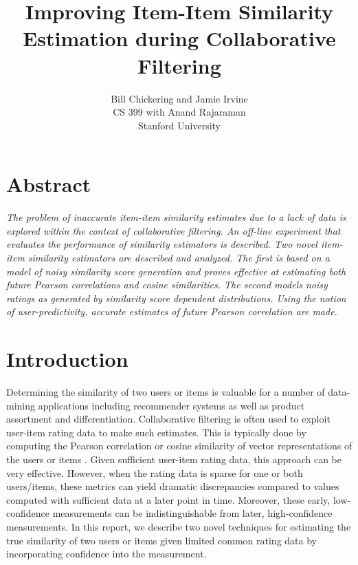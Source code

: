 \documentclass[11pt]{article}
\begin{document}

\title{Improving Item-Item Similarity Estimation during Collaborative Filtering}
\author{Bill Chickering and Jamie Irvine\\
CS 399 with Anand Rajaraman\\
Stanford University}
\renewcommand{\today}{March 25, 2014}
\maketitle

\section*{Abstract}
\emph{The problem of inaccurate item-item similarity estimates due to a lack of
data is explored within the context of collaborative filtering. An off-line
experiment that evaluates the performance of similarity estimators is described.
Two novel item-item similarity estimators are described and analyzed. The first
is based on a model of noisy similarity score generation and proves effective at
estimating both future Pearson correlations and cosine similarities. The second
models noisy ratings as generated by similarity score dependent distributions.
Using the notion of user-predictivity, accurate estimates of future Pearson
correlation are made.}

\section*{Introduction}
Determining the similarity of two users or items is valuable for a number of
data-mining applications including recommender systems as well as product
assortment and differentiation. Collaborative filtering is often used to exploit
user-item rating data to make such estimates. This is typically done by
computing the Pearson correlation or cosine similarity of vector representations
of the users or items \cite{Su2009}. Given sufficient user-item rating data,
this approach can be very effective. However, when the rating data is sparse for
one or both users/items, these metrics can yield dramatic discrepancies compared
to values computed with sufficient data at a later point in time. Moreover,
these early, low-confidence measurements can be indistinguishable from later,
high-confidence measurements.  In this report, we describe two novel techniques
for estimating the true similarity of two users or items given limited common
rating data by incorporating confidence into the measurement.
\end{document}
